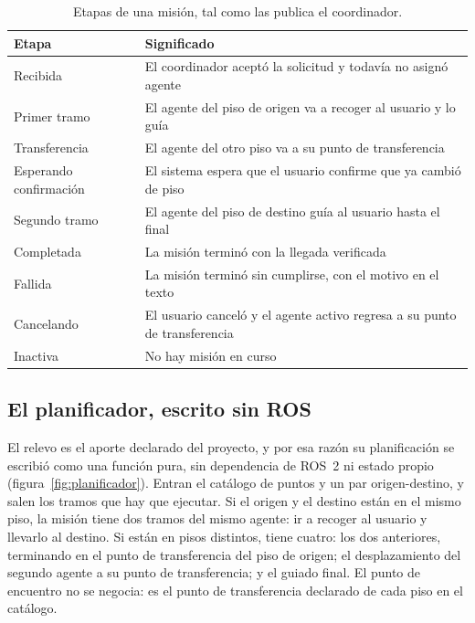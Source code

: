 \begin{table}[htbp]
  \centering\small
  \caption{Etapas de una misión, tal como las publica el coordinador.}
  \label{tab:etapas-mision}
  \begin{tabular}{@{}p{}p{}@{}}
    \toprule
    \textbf{Etapa} & \textbf{Significado} \\ \midrule
    Recibida & El coordinador aceptó la solicitud y todavía no asignó agente \\
    Primer tramo & El agente del piso de origen va a recoger al usuario y lo guía \\
    Transferencia & El agente del otro piso va a su punto de transferencia \\
    Esperando confirmación & El sistema espera que el usuario confirme que ya cambió de piso \\
    Segundo tramo & El agente del piso de destino guía al usuario hasta el final \\
    Completada & La misión terminó con la llegada verificada \\
    Fallida & La misión terminó sin cumplirse, con el motivo en el texto \\
    Cancelando & El usuario canceló y el agente activo regresa a su punto de transferencia \\
    Inactiva & No hay misión en curso \\ \bottomrule
  \end{tabular}
\end{table}

\subsection{El planificador, escrito sin ROS}
\label{sec:planificador}

El relevo es el aporte declarado del proyecto, y por esa razón su planificación se escribió como una función pura, sin dependencia de ROS~2 ni
estado propio (figura~\ref{fig:planificador}). Entran el catálogo de puntos y un par origen-destino, y salen los tramos que hay que ejecutar. Si
el origen y el destino están en el mismo piso, la misión tiene dos tramos del mismo agente: ir a recoger al usuario y llevarlo al destino. Si
están en pisos distintos, tiene cuatro: los dos anteriores, terminando en el punto de transferencia del piso de origen; el desplazamiento del
segundo agente a su punto de transferencia; y el guiado final. El punto de encuentro no se negocia: es el punto de transferencia declarado
de cada piso en el catálogo.

